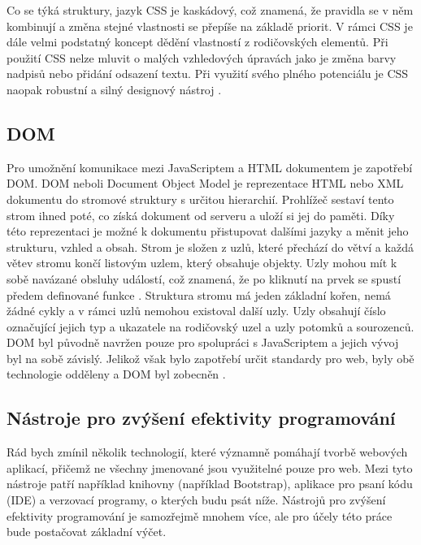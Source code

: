 Co se týká struktury, jazyk CSS je kaskádový, což znamená, že pravidla se v něm kombinují a změna stejné vlastnosti se přepíše na základě priorit. V rámci CSS je dále velmi podstatný koncept dědění vlastností z rodičovských elementů. Při použití CSS nelze mluvit o malých vzhledových úpravách jako je změna barvy nadpisů nebo přidání odsazení textu. Při využití svého plného potenciálu je CSS naopak robustní a silný designový nástroj \cite{learningdesign}.

        \subsection{DOM}
Pro umožnění komunikace mezi JavaScriptem a HTML dokumentem je zapotřebí DOM. DOM neboli Document Object Model je reprezentace HTML nebo XML dokumentu do stromové struktury s určitou hierarchií. Prohlížeč sestaví tento strom ihned poté, co získá dokument od serveru a uloží si jej do paměti. Díky této reprezentaci je možné k dokumentu přistupovat dalšími jazyky a měnit jeho strukturu, vzhled a obsah. Strom je složen z uzlů, které přechází do větví a každá větev stromu končí listovým uzlem, který obsahuje objekty. Uzly mohou mít k sobě navázané obsluhy událostí, což znamená, že po kliknutí na prvek se spustí předem definované funkce \cite{domintro}. Struktura stromu má jeden základní kořen, nemá žádné cykly a v rámci uzlů nemohou existoval další uzly. Uzly obsahují číslo označující jejich typ a ukazatele na rodičovský uzel a uzly potomků a sourozenců. DOM byl původně navržen pouze pro spolupráci s JavaScriptem a jejich vývoj byl na sobě závislý. Jelikož však bylo zapotřebí určit standardy pro web, byly obě technologie odděleny a DOM byl zobecněn \cite{learningdesign}.
        \subsection{Nástroje pro zvýšení efektivity programování}
Rád bych zmínil několik technologií, které významně pomáhají tvorbě webových aplikací, přičemž ne všechny jmenované jsou využitelné pouze pro web. Mezi tyto nástroje patří například knihovny (například Bootstrap), aplikace pro psaní kódu (IDE) a verzovací programy, o kterých budu psát níže. Nástrojů pro zvýšení efektivity programování je samozřejmě mnohem více, ale pro účely této práce bude postačovat základní výčet.

